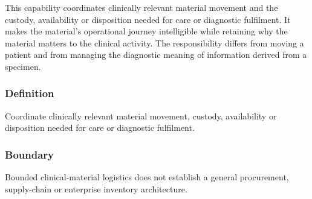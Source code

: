 This capability coordinates clinically relevant material movement and the custody, availability or disposition needed for care or diagnostic fulfilment. It makes the material's operational journey intelligible while retaining why the material matters to the clinical activity. The responsibility differs from moving a patient and from managing the diagnostic meaning of information derived from a specimen.

\subsubsection*{Definition}

Coordinate clinically relevant material movement, custody, availability or disposition needed for care or diagnostic fulfilment.

\subsubsection*{Boundary}

Bounded clinical-material logistics does not establish a general procurement, supply-chain or enterprise inventory architecture.

